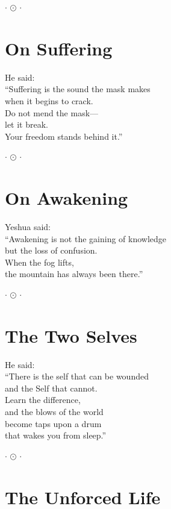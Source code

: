 \documentclass[10pt, openright]{book}
\newcommand{\sectionbreak}{\filbreak}
\newcommand{\ornament}{
    \vspace{1.5cm}
    \begin{center}
        \large \(\cdot\) \(\odot\) \(\cdot\)
    \end{center}
    \vspace{1.5cm}
}
\begin{document}
\ornament

\sectionbreak

\section{On Suffering}\label{on-suffering}

He said:\\
``Suffering is the sound the mask makes\\
when it begins to crack.\\
Do not mend the mask---\\
let it break.\\
Your freedom stands behind it.''

\ornament

\sectionbreak

\section{On Awakening}\label{on-awakening}

Yeshua said:\\
``Awakening is not the gaining of knowledge\\
but the loss of confusion.\\
When the fog lifts,\\
the mountain has always been there.''

\ornament

\sectionbreak

\section{The Two Selves}\label{the-two-selves}

He said:\\
``There is the self that can be wounded\\
and the Self that cannot.\\
Learn the difference,\\
and the blows of the world\\
become taps upon a drum\\
that wakes you from sleep.''

\ornament

\sectionbreak

\section{The Unforced Life}\label{the-unforced-life}
\end{document}
